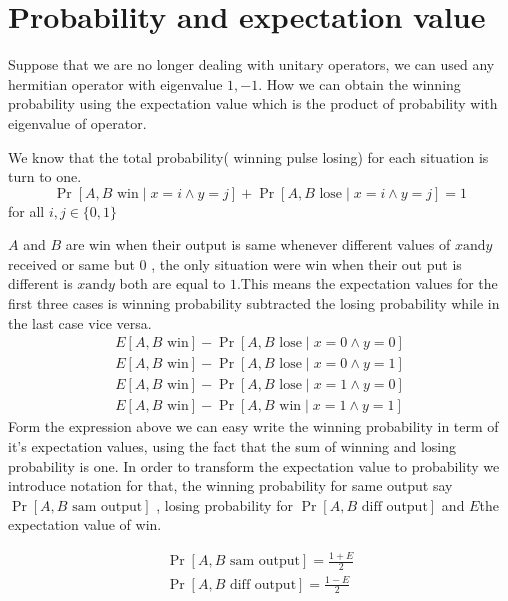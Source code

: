 \section*{Probability  and expectation value}
Suppose that we are no longer dealing with unitary operators, we can used any hermitian operator with eigenvalue $1,-1$. How we can obtain the winning probability using the expectation value which is the product  of probability with  eigenvalue of operator.

We know that the total probability( winning pulse losing) for each situation is turn to one.
$$\Pr[A,B \text{ win} \mid  x=i \wedge y=j]+\Pr[A,B \text{ lose}  \mid  x=i \wedge y=j]=1$$ for all $i,j \in \{0,1\}$


$A$ and $B$ are win when their output is same whenever  different values of $x  \text{and}  y$ received or same but $0$ , the only situation were win when their out put is different is $x  \text{and} y$ both are equal to $1$.This means the expectation values for  the first three  cases is   winning probability subtracted  the losing probability while in the last case vice versa.
\begin{align*}
E[A,B \text{ win}]-\Pr[A,B \text{ lose}  \mid  x=0 \wedge y=0]\\
E[A,B \text{ win}]-\Pr[A,B \text{ lose}  \mid  x=0 \wedge y=1]\\
E[A,B \text{ win} ]-\Pr[A,B \text{ lose}  \mid  x=1 \wedge y=0]\\
E[A,B \text{ win} ]-\Pr[A,B \text{ win}  \mid  x=1 \wedge y=1]
\end{align*}
Form the expression above we can easy write the winning probability in term of it's expectation values, using the fact that the sum of winning and losing probability  is one. In order to transform the expectation value to probability we introduce notation for that, the winning probability for same output say $\Pr[A,B \text{ sam output}]$ , losing probability for $\Pr[A,B \text{ diff output}]$ and $E$the expectation value of win.

\begin{align*}
\Pr[A,B \text{ sam output}]=\frac{1+E}{2}\\
\Pr[A,B \text{ diff output}]=\frac{1-E}{2}
\end{align*}


